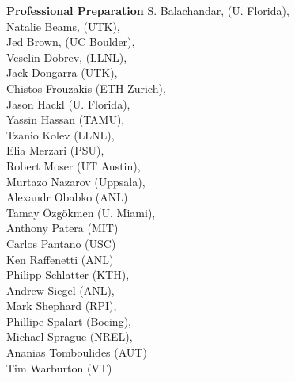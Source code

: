 \documentclass[11pt,letterpaper,english]{article}
\begin{document}
\begin{flushleft} {\bf Professional Preparation}
{ S. Balachandar, (U. Florida), \\
 Natalie Beams, (UTK), \\
 Jed Brown, (UC Boulder), \\
 Veselin Dobrev, (LLNL), \\
 Jack Dongarra  (UTK), \\
 Chistos Frouzakis (ETH Zurich), \\
 Jason Hackl   (U. Florida),  \\
 Yassin Hassan (TAMU),  \\
 Tzanio Kolev (LLNL),  \\
 Elia Merzari (PSU), \\
 Robert Moser (UT Austin), \\
 Murtazo Nazarov (Uppsala), \\
Alexandr Obabko (ANL) \\
 Tamay \"Ozg\"okmen (U. Miami),  \\
Anthony Patera (MIT) \\
Carlos Pantano (USC) \\
Ken Raffenetti (ANL) \\
 Philipp Schlatter (KTH), \\
 Andrew Siegel     (ANL), \\
 Mark Shephard     (RPI), \\
 Phillipe Spalart (Boeing), \\
 Michael Sprague (NREL), \\
Ananias Tomboulides (AUT) \\
 Tim Warburton (VT) \\
 }


\end{flushleft}
\end{document}
